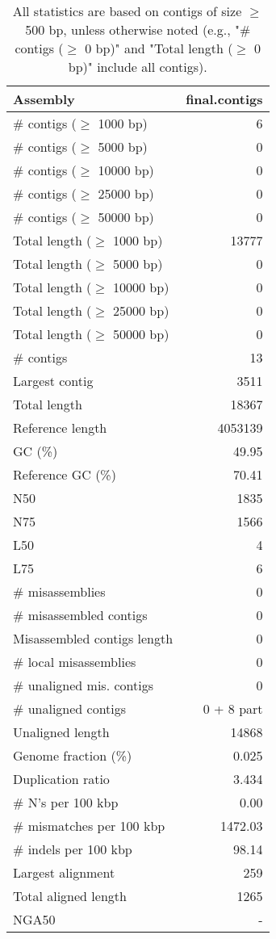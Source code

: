 \documentclass[12pt,a4paper]{article}
\begin{document}
\begin{table}[ht]
\begin{center}
\caption{All statistics are based on contigs of size $\geq$ 500 bp, unless otherwise noted (e.g., "\# contigs ($\geq$ 0 bp)" and "Total length ($\geq$ 0 bp)" include all contigs).}
\begin{tabular}{|l*{1}{|r}|}
\hline
Assembly & final.contigs \\ \hline
\# contigs ($\geq$ 1000 bp) & 6 \\ \hline
\# contigs ($\geq$ 5000 bp) & 0 \\ \hline
\# contigs ($\geq$ 10000 bp) & 0 \\ \hline
\# contigs ($\geq$ 25000 bp) & 0 \\ \hline
\# contigs ($\geq$ 50000 bp) & 0 \\ \hline
Total length ($\geq$ 1000 bp) & 13777 \\ \hline
Total length ($\geq$ 5000 bp) & 0 \\ \hline
Total length ($\geq$ 10000 bp) & 0 \\ \hline
Total length ($\geq$ 25000 bp) & 0 \\ \hline
Total length ($\geq$ 50000 bp) & 0 \\ \hline
\# contigs & 13 \\ \hline
Largest contig & 3511 \\ \hline
Total length & 18367 \\ \hline
Reference length & 4053139 \\ \hline
GC (\%) & 49.95 \\ \hline
Reference GC (\%) & 70.41 \\ \hline
N50 & 1835 \\ \hline
N75 & 1566 \\ \hline
L50 & 4 \\ \hline
L75 & 6 \\ \hline
\# misassemblies & 0 \\ \hline
\# misassembled contigs & 0 \\ \hline
Misassembled contigs length & 0 \\ \hline
\# local misassemblies & 0 \\ \hline
\# unaligned mis. contigs & 0 \\ \hline
\# unaligned contigs & 0 + 8 part \\ \hline
Unaligned length & 14868 \\ \hline
Genome fraction (\%) & 0.025 \\ \hline
Duplication ratio & 3.434 \\ \hline
\# N's per 100 kbp & 0.00 \\ \hline
\# mismatches per 100 kbp & 1472.03 \\ \hline
\# indels per 100 kbp & 98.14 \\ \hline
Largest alignment & 259 \\ \hline
Total aligned length & 1265 \\ \hline
NGA50 & - \\ \hline
\end{tabular}
\end{center}
\end{table}
\end{document}
